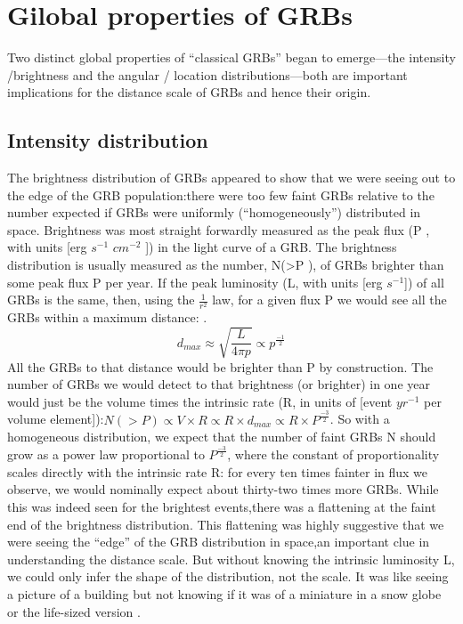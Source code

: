 \section{Gilobal properties of GRBs}
Two distinct global properties of “classical GRBs” began to emerge—the intensity
/brightness and the angular / location distributions—both are important implications
for the distance scale of GRBs and hence their origin.
\subsection{Intensity distribution}
The brightness distribution of GRBs appeared to show that we were seeing out
to the edge of the GRB population:there were too few faint GRBs relative to the
number expected if GRBs were uniformly (“homogeneously”) distributed in space.
Brightness was most straight forwardly measured as the peak flux (P , with units
[erg $ s^{-1} $ $cm^{-2} $ ]) in the light curve of a GRB. The brightness distribution is usually measured as the number, N(>P ), of GRBs brighter than some peak flux P per year. If the peak luminosity (L, with units [erg $ s^{-1} $]) of all GRBs is the same, then, using the $ \frac{1}{r^{2}} $ law, for a given flux P we would see all the GRBs within a maximum distance:\citep{7} \citep{12}.
\begin{equation}
d_{max}\approx\sqrt{\frac{L}{4\pi p}}\varpropto p^{\frac{-1}{2}}
\end{equation}
All the GRBs to that distance would be brighter than P by construction. The
number of GRBs we would detect to that brightness (or brighter) in one year would
just be the volume times the intrinsic rate (R, in units of [event $yr^{-1}$ per volume element]):$ N (> P ) \propto V \times R \propto R \times d_{max} \propto R \times P^{\frac{-3}{2}}$.  So with a homogeneous distribution, we expect that the number of faint GRBs N should grow as a power law proportional to $P^{\frac{-3}{2}} $, where the constant of proportionality scales directly with the intrinsic rate R: for every ten times fainter in flux we observe, we would nominally expect about thirty-two times more GRBs. While this was indeed seen for the brightest events,there was a flattening at the faint end of the brightness distribution. This flattening was highly suggestive that we were seeing the “edge” of the GRB distribution in space,an important clue in understanding the distance scale. But without knowing the intrinsic luminosity L, we could only infer the shape of the distribution, not the scale. It was like seeing a picture of a building but not knowing if it was of a miniature in a snow globe or the life-sized version \citep{7}\citep{12}.\\\\
